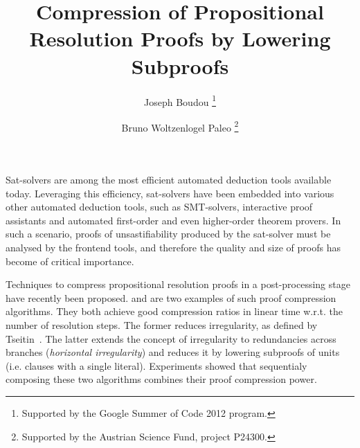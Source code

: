 \documentclass{easychair}
\title{Compression of Propositional Resolution Proofs by Lowering Subproofs}
\author{
  Joseph Boudou\inst{1}
  \thanks{Supported by the Google Summer of Code 2012 program.}
  \and 
  Bruno Woltzenlogel Paleo\inst{2}
  \thanks{Supported by the Austrian Science Fund, project P24300.}
}
\institute{
  Universit\'e Paul Sabatier, Toulouse \\
  \email{joseph.boudou@matabio.net}
  \and 
  Vienna University of Technology \\
  \email{bruno@logic.at}
}
\begin{document}
\maketitle

Sat-solvers are among the most efficient automated deduction tools available today.
Leveraging this efficiency, sat-solvers have been embedded
into various other automated deduction tools,
such as SMT-solvers, interactive proof assistants and automated first-order
and even higher-order theorem provers.
In such a scenario, proofs of unsastifiability produced by the sat-solver must be analysed by the
frontend tools, and therefore the quality and size of proofs has become of critical importance.



Techniques to compress propositional resolution proofs in a post-processing stage have recently been
proposed.  \RecyclePivotsIntersection and \LowerUnits \cite{LURPI} are two examples of such proof
compression algorithms. They both achieve good compression ratios in linear time w.r.t. the number
of resolution steps. The former reduces irregularity, as defined by Tseitin~\cite{Tseitin}. The
latter extends the concept of irregularity to redundancies across branches (\emph{horizontal
irregularity}) and reduces it by lowering subproofs of units (i.e. clauses with a single literal).
Experiments \cite{LURPI} showed that sequentialy composing these two algorithms combines their proof
compression power.
\end{document}
